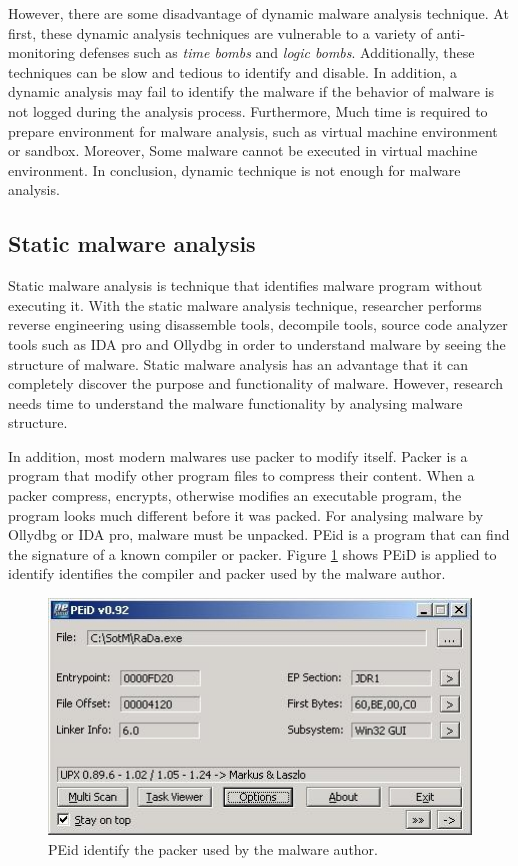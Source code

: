 However, there are some disadvantage of dynamic malware analysis technique. At first, these dynamic analysis techniques are vulnerable to a variety of anti-monitoring defenses such as \emph{time bombs} and \emph{logic bombs}. Additionally, these techniques can be slow and tedious to identify and disable. In addition, a dynamic analysis may fail to identify the malware if the behavior of malware is not logged during the analysis process. Furthermore, Much time is required to prepare environment for malware analysis, such as virtual machine environment or sandbox. Moreover, Some malware cannot be executed in virtual machine environment. In conclusion, dynamic technique is not enough for malware analysis. 

\subsection{Static malware analysis}

Static malware analysis is technique that identifies malware program without executing it. With the static malware analysis technique, researcher performs reverse engineering using disassemble tools, decompile tools, source code analyzer tools such as IDA pro and Ollydbg in order to understand malware by seeing the structure of malware. Static malware analysis has an advantage that it can completely discover the purpose and functionality of malware. However, research needs time to understand the malware functionality by analysing malware structure.

In addition, most modern malwares use packer to modify itself. Packer is a program that modify other program files to compress their content. When a packer compress, encrypts, otherwise modifies an executable program, the program looks much different before it was packed. For analysing malware by Ollydbg or IDA pro, malware must be unpacked. PEid is a program that can find the signature of a known compiler or packer. Figure \ref{fig:PEid} shows PEiD is applied to identify identifies the compiler and packer used by the malware author.

\begin{figure}[h!]
\centering
\includegraphics[width=1\textwidth]{graph/PEid.jpg}
\caption{PEid identify the packer used by the malware author.}
\label{fig:PEid}
\end{figure}

